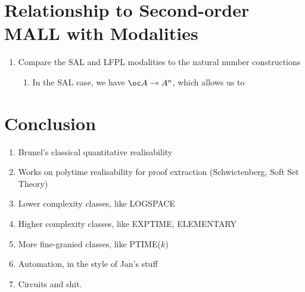 \documentclass[acmsmall,review]{acmart}
\begin{document}

\section{Relationship to Second-order MALL with Modalities}
\label{sec:poly-mall}

\begin{enumerate}
\item Compare the SAL and LFPL modalities to the natural number
  constructions
  \begin{enumerate}
  \item In the SAL case, we have $\oc A \multimap A^n$, which allows
    us to
  \end{enumerate}
\end{enumerate}

\section{Conclusion}
\label{sec:conclusion}

\begin{enumerate}
\item Brunel's classical quantitative realisability
\item Works on polytime realisability for proof extraction (Schwictenberg, Soft Set Theory)
\item Lower complexity classes, like LOGSPACE
\item Higher complexity classes, like EXPTIME, ELEMENTARY
\item More fine-granied classes, like PTIME($k$)
\item Automation, in the style of Jan's stuff
\item Circuits and shit.
\end{enumerate}
\end{document}
